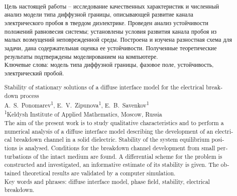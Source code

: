 \documentclass[a4paper,12pt]{article}
\title{
	\ArticleTitle
}
\author{
	\ArticleAuthors \\[3mm]
	{\normalsize \ArticleInstitutes}
}
\date{\vspace{-0.8cm}}
\theoremstyle{plain}
\theoremstyle{remark}
\newcommand{\ArticleTitleEnglish}{
	Stability of stationary solutions of a diffuse interface model for the electrical breakdown process
}
\newcommand{\ArticleAuthorsEnglish}{
	A.~S.~Ponomarev\textsuperscript{1}, E.~V.~Zipunova\textsuperscript{1}, E.~B.~Savenkov\textsuperscript{1}
}
\newcommand{\ArticleInstitutesEnglish}{
	\textsuperscript{1}Keldysh Institute of Applied Mathematics, Moscow, Russia
}
\begin{document}
\maketitle

\renewcommand{\abstractname}{}
\renewcommand{\absnamepos}{empty}
\begin{abstract}
{
	\noindent Цель настоящей работы -- исследование качественных характеристик и численный анализ модели типа диффузной границы, описывающей развитие канала электрического пробоя в твердом диэлектрике. Проведен анализ устойчивости положений равновесия системы; установлены условия развития канала пробоя из малых возмущений неповрежденной среды. Построена и изучена разностная схема для задачи, дана содержательная оценка ее устойчивости. Полученные теоретические результаты подтверждены моделированием на компьютере. \\[3mm]
	Ключевые слова: модель типа диффузной границы, фазовое поле, устойчивость, электрический пробой. \\[5mm]
}
\begin{otherlanguage}{english}
	\ArticleTitleEnglish \\[3mm]
	\ArticleAuthorsEnglish \\[3mm]
	\ArticleInstitutesEnglish \\[3mm]
	The aim of the present work is to study qualitative characteristics and to perform a numerical analysis of a diffuse interface model describing the development of an electrical breakdown channel in a solid dielectric. Stability of the system equilibrium positions is analysed. Conditions for the breakdown channel development from small perturbations of the intact medium are found. A differential scheme for the problem is constructed and investigated, an informative estimate of its stability is given. The obtained theoretical results are validated by a computer simulation. \\[3mm]
	Key words and phrases: diffuse interface model, phase field, stability, electrical breakdown.
\end{otherlanguage}
\end{abstract}














\clearpage
\printbibliography

\clearpage
\tableofcontents
\end{document}
